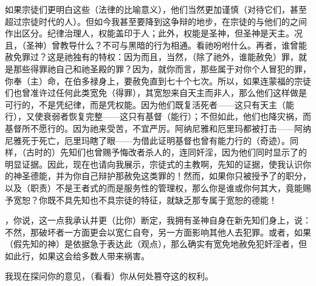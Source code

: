 如果宗徒们更明白这些（法律的比喻意义），他们当然更加谨慎（对待它们，甚至超过宗徒时代的人）。但如今我甚至要降到这争辩的地步，在宗徒的与他们的之间作出区分。纪律治理人，权能盖印于人；此外，权能是圣神，但圣神是天主。况且，（圣神）曾教导什么？不可与黑暗的行为相通。看祂吩咐什么。再者，谁曾能赦免罪过？这是祂独有的特权：因为而且，当然，（除了祂外，谁能赦免）罪，就是那些得罪祂自己和祂圣殿的罪？因为，就你而言，那些属于对你个人冒犯的罪，你奉（主）命，在伯多禄身上，要赦免直到七十个七次。所以，如果连蒙福的宗徒们也曾准许过任何此类宽免（得罪），其宽恕来自天主而非人，那么他们这样做是可行的，不是凭纪律，而是凭权能。因为他们既复活死者——这只有天主（能行），又使衰弱者恢复完整——这只有基督（能行）；不但如此，他们也降灾祸，而基督所不愿行的。因为祂来受苦，不宜严厉。阿纳尼雅和厄里玛都被打击——阿纳尼雅死于死亡，厄里玛瞎了眼——为借此证明基督也曾有能力行的（奇迹）。同样，（古时的）先知们也曾赐予悔改者杀人的，连同奸淫，因为他们同时显示了的明显证据。因此，现在也请向我展示，宗徒式的主教啊，先知的证据，使我认识你的神圣德能，并为你自己辩护那赦免这类罪的！然而，如果你只被授予了的职分，以及（职责）不是王者式的而是服务性的管理权，那么你是谁或你何其大，竟能赐予宽恕？你既不具先知也不具宗徒的特征，就缺乏那专属于宽恕的德能！\par

，你说，这一点我承认并更（比你）断定，我拥有圣神自身在新先知们身上，说：不然，那破坏者一方面更会以宽仁自夸，另一方面影响其他人去犯罪。或者，如果（假先知的神）是依据急于表达此（观点），那么确实有宽免地赦免犯奸淫者，但如此行，如果这会给多数人带来祸害。\par

我现在探问你的意见，（看看）你从何处篡夺这的权利。\par

